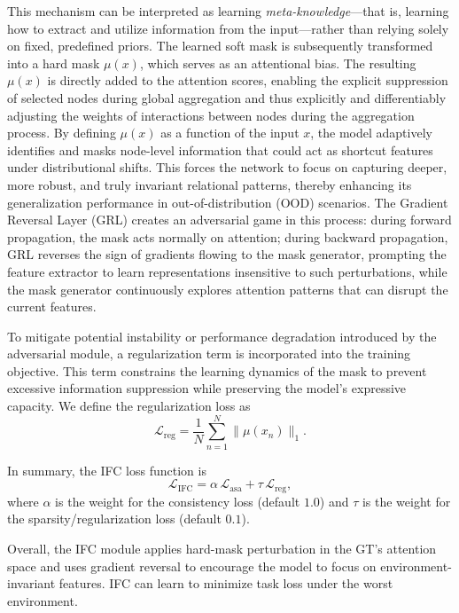 \documentclass[a4paper,fleqn]{cas-dc}
\begin{document}
This mechanism can be interpreted as learning \textit{meta-knowledge}—that is, learning how to extract and utilize information from the input—rather than relying solely on fixed, predefined priors. The learned soft mask is subsequently transformed into a hard mask \(\mu(x)\), which serves as an attentional bias. The resulting \(\mu(x)\) is directly added to the attention scores, enabling the explicit suppression of selected nodes during global aggregation and thus explicitly and differentiably adjusting the weights of interactions between nodes during the aggregation process. By defining \(\mu(x)\) as a function of the input \(x\), the model adaptively identifies and masks node-level information that could act as shortcut features under distributional shifts. This forces the network to focus on capturing deeper, more robust, and truly invariant relational patterns, thereby enhancing its generalization performance in out-of-distribution (OOD) scenarios. The Gradient Reversal Layer (GRL) creates an adversarial game in this process: during forward propagation, the mask acts normally on attention; during backward propagation, GRL reverses the sign of gradients flowing to the mask generator, prompting the feature extractor to learn representations insensitive to such perturbations, while the mask generator continuously explores attention patterns that can disrupt the current features.

To mitigate potential instability or performance degradation introduced by the adversarial module, a regularization term is incorporated into the training objective. This term constrains the learning dynamics of the mask to prevent excessive information suppression while preserving the model’s expressive capacity. We define the regularization loss as
\[
\mathcal{L}_{\mathrm{reg}} = \frac{1}{N} \sum_{n=1}^{N} \|\mu(x_n)\|_1. \tag{5}
\]

In summary, the IFC loss function is
\[
\mathcal{L}_{\mathrm{IFC}} = \alpha\, \mathcal{L}_{\mathrm{asa}} + \tau\, \mathcal{L}_{\mathrm{reg}}, \tag{6}
\]
where \(\alpha\) is the weight for the consistency loss (default \(1.0\)) and \(\tau\) is the weight for the sparsity/regularization loss (default \(0.1\)).

Overall, the IFC module applies hard-mask perturbation in the GT's attention space and uses gradient reversal to encourage the model to focus on environment-invariant features. IFC can learn to minimize task loss under the worst environment.
\label{ifc}
\end{document}
